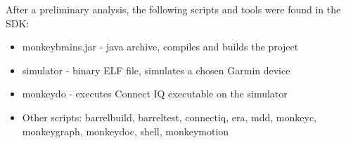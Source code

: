 After a preliminary analysis, the following scripts and tools were found in the SDK:

\begin{itemize}
    \item monkeybrains.jar - java archive, compiles and builds the project
    \item simulator - binary ELF file, simulates a chosen Garmin device
    \item monkeydo - executes Connect IQ executable on the simulator
    \item Other scripts: barrelbuild, barreltest, connectiq, era, mdd, monkeyc, monkeygraph, monkeydoc, shell, monkeymotion
\end{itemize}